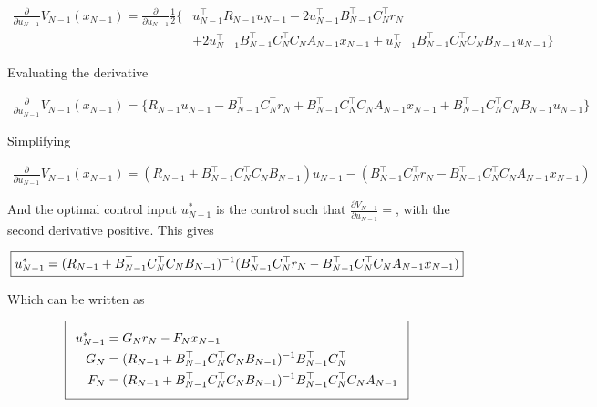 \documentclass[11pt,letterpaper,onecolumn,notitlepage]{article}
\begin{document}
\begin{equation*}
  \begin{split}
    \frac{\partial}{\partial u_{N-1}}V_{N-1}(x_{N-1})=\frac{\partial}{\partial u_{N-1}}\frac{1}{2}\biggr\{&u_{N-1}^{\top}R_{N-1}u_{N-1}-2u_{N-1}^{\top}B_{N-1}^{\top}C_{N}^{\top}r_{N} \\
    &+2u_{N-1}^{\top}B_{N-1}^{\top}C_{N}^{\top}C_{N}A_{N-1}x_{N-1}+
    u_{N-1}^{\top}B_{N-1}^{\top}C_{N}^{\top}C_{N}B_{N-1}u_{N-1}\biggr\}
  \end{split}
\end{equation*}

Evaluating the derivative

\begin{equation*}
  \begin{split}
    \frac{\partial}{\partial u_{N-1}}V_{N-1}(x_{N-1})=\biggr\{R_{N-1}u_{N-1}-B_{N-1}^{\top}C_{N}^{\top}r_{N}+B_{N-1}^{\top}C_{N}^{\top}C_{N}A_{N-1}x_{N-1}+B_{N-1}^{\top}C_{N}^{\top}C_{N}B_{N-1}u_{N-1}\biggr\}
  \end{split}
\end{equation*}

Simplifying

\begin{equation*}
  \begin{split}
    \frac{\partial}{\partial u_{N-1}}V_{N-1}(x_{N-1})=(R_{N-1}+B_{N-1}^{\top}C_{N}^{\top}C_{N}B_{N-1})u_{N-1}-(B_{N-1}^{\top}C_{N}^{\top}r_{N}-B_{N-1}^{\top}C_{N}^{\top}C_{N}A_{N-1}x_{N-1})
  \end{split}
\end{equation*}

And the optimal control input $u_{N-1}^{*}$ is the control such that $\frac{\partial V_{N-1}}{\partial u_{N-1}}=$, with the second derivative positive.
This gives

\begin{equation*}
  \boxed{%
    u_{N-1}^{*}=(R_{N-1}+B_{N-1}^{\top}C_{N}^{\top}C_{N}B_{N-1})^{-1}(B_{N-1}^{\top}C_{N}^{\top}r_{N}-B_{N-1}^{\top}C_{N}^{\top}C_{N}A_{N-1}x_{N-1})
  }
\end{equation*}

Which can be written as

\begin{equation*}
  \addtolength{\fboxsep}{5pt}
  \boxed{%
    \begin{split}
      u_{N-1}^{*}&=G_{N}r_{N}-F_{N}x_{N-1} \\
      G_{N}&=(R_{N-1}+B_{N-1}^{\top}C_{N}^{\top}C_{N}B_{N-1})^{-1}B_{N-1}^{\top}C_{N}^{\top} \\
      F_{N}&=(R_{N-1}+B_{N-1}^{\top}C_{N}^{\top}C_{N}B_{N-1})^{-1}B_{N-1}^{\top}C_{N}^{\top}C_{N}A_{N-1}
    \end{split}
  }
\end{equation*}
\end{document}

